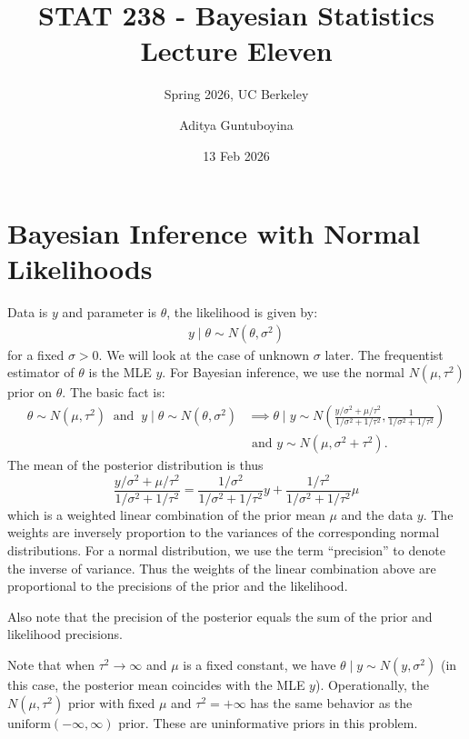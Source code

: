 \documentclass{scrartcl}
\begin{document}
\title{STAT 238 - Bayesian Statistics  \\
  Lecture Eleven} 
\subtitle{Spring 2026, UC Berkeley}

\author{Aditya Guntuboyina}


\date{13 Feb 2026}

\maketitle

\section{Bayesian Inference with Normal Likelihoods}
Data is $y$ and parameter is $\theta$, the likelihood is given by:
\begin{align*}
  y \mid \theta \sim N(\theta, \sigma^2)
\end{align*}
for a fixed $\sigma > 0$. We will look at the case of unknown $\sigma$
later. The frequentist estimator of $\theta$ is the MLE $y$. For
Bayesian inference, we use the normal $N(\mu, \tau^2)$ prior on
$\theta$. The basic fact is:
\begin{align*}
  \theta \sim N(\mu, \tau^2) ~ \text{ and } ~ y \mid \theta \sim
  N(\theta, \sigma^2) &\implies \theta \mid y \sim N
  \left(\frac{y/\sigma^2 + \mu/\tau^2}{1/\sigma^2 + 1/\tau^2},
  \frac{1}{1/\sigma^2 + 1/\tau^2} \right) \\ &\text{ and } y \sim N(\mu,
  \sigma^2 + \tau^2). 
\end{align*}
The mean of the posterior distribution is thus
\begin{equation*}
  \frac{y/\sigma^2 +
      \mu/\tau^2}{1/\sigma^2 + 1/\tau^2} =
    \frac{1/\sigma^2}{1/\sigma^2 + 1/\tau^2} y +
    \frac{1/\tau^2}{1/\sigma^2 + 1/\tau^2} \mu
  \end{equation*}
which is a weighted linear combination of the prior mean $\mu$ and the
data $y$. The weights are inversely proportion to the variances of the
corresponding normal distributions. For a normal distribution, we use
the term ``precision'' to denote the inverse of variance. Thus the
weights of the linear combination above are proportional to the
precisions of the prior and the likelihood.

Also note that the precision of the posterior equals the sum of the
prior and likelihood precisions.

Note that when $\tau^2 \rightarrow \infty$ and $\mu$ is a fixed
constant, we have $\theta \mid y 
\sim N(y, \sigma^2)$ (in this case, the posterior mean coincides with
the MLE $y$). Operationally, the $N(\mu, \tau^2)$ prior with 
fixed $\mu$ and $\tau^2 = +\infty$ has the same behavior as the
$\text{uniform}(-\infty, \infty)$ prior. These are uninformative
priors in this problem. 
\end{document}
